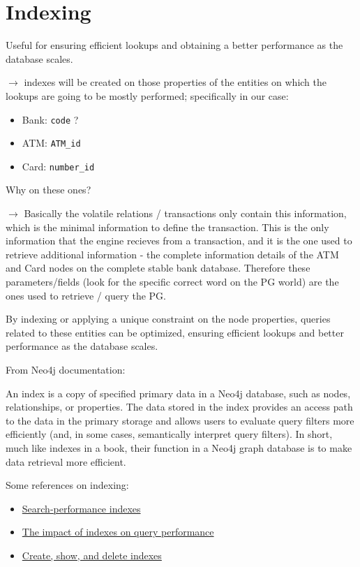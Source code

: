 \documentclass{article}
\begin{document}
\section{Indexing}

Useful for ensuring efficient lookups and obtaining a better performance as the database 
scales.

$\rightarrow$ indexes will be created on those properties of the entities on which the 
lookups are going to be mostly performed; specifically in our case:
\begin{itemize}
  \item Bank: \texttt{code} ?
  \item ATM: \texttt{ATM\_id}
  \item Card: \texttt{number\_id}
\end{itemize}

Why on these ones?

$\rightarrow$ Basically the volatile relations / transactions only contain this information,
which is the minimal information to define the transaction. This is the only information that
the engine recieves from a transaction, and it is the one used to retrieve additional information - the complete information details of the ATM and Card nodes on the complete
stable bank database. Therefore these parameters/fields (look for the specific correct
word on the PG world) are the ones used to retrieve / query the PG. 

By indexing or applying a unique constraint on the node properties, queries related to these entities can be optimized, ensuring efficient lookups and better performance as the database scales.

From Neo4j documentation:
\begin{tcolorbox}
  An index is a copy of specified primary data in a Neo4j database, such as nodes, relationships, or properties. The data stored in the index provides an access path to the data in the primary storage and allows users to evaluate query filters more efficiently (and, in some cases, semantically interpret query filters). In short, much like indexes in a book, their function in a Neo4j graph database is to make data retrieval more efficient.
\end{tcolorbox}

Some references on indexing:
\begin{itemize}
  \item \href{https://neo4j.com/docs/cypher-manual/current/indexes/search-performance-indexes/overview/}{Search-performance indexes}
  \item \href{https://neo4j.com/docs/cypher-manual/current/indexes/search-performance-indexes/using-indexes/}{The impact of indexes on query performance}
  \item \href{https://neo4j.com/docs/cypher-manual/current/indexes/search-performance-indexes/managing-indexes/}{Create, show, and delete indexes}
\end{itemize}
\end{document}

